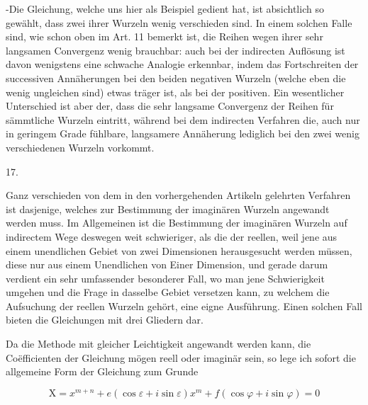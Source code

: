 \documentclass[10pt]{article}
\begin{document}
-Die Gleichung, welche uns hier als Beispiel gedient hat, ist absichtlich so gewählt, dass zwei ihrer Wurzeln wenig verschieden sind. In einem solchen Falle sind, wie schon oben im Art. 11 bemerkt ist, die Reihen wegen ihrer sehr langsamen Convergenz wenig brauchbar: auch bei der indirecten Auflösung ist davon wenigstens eine schwache Analogie erkennbar, indem das Fortschreiten der successiven Annäherungen bei den beiden negativen Wurzeln (welche eben die wenig ungleichen sind) etwas träger ist, als bei der positiven. Ein wesentlicher Unterschied ist aber der, dass die sehr langsame Convergenz der Reihen für sämmtliche Wurzeln eintritt, während bei dem indirecten Verfahren die, auch nur in geringem Grade fühlbare, langsamere Annäherung lediglich bei den zwei wenig verschiedenen Wurzeln vorkommt.

17.

Ganz verschieden von dem in den vorhergehenden Artikeln gelehrten Verfahren ist dasjenige, welches zur Bestimmung der imaginären Wurzeln angewandt werden muss. Im Allgemeinen ist die Bestimmung der imaginären Wurzeln auf indirectem Wege deswegen weit schwieriger, als die der reellen, weil jene aus einem unendlichen Gebiet von zwei Dimensionen herausgesucht werden müssen, diese nur aus einem Unendlichen von Einer Dimension, und gerade darum verdient ein sehr umfassender besonderer Fall, wo man jene Schwierigkeit umgehen und die Frage in dasselbe Gebiet versetzen kann, zu welchem die Aufsuchung der reellen Wurzeln gehört, eine eigne Ausführung. Einen solchen Fall bieten die Gleichungen mit drei Gliedern dar.

Da die Methode mit gleicher Leichtigkeit angewandt werden kann, die Coëfficienten der Gleichung mögen reell oder imaginär sein, so lege ich sofort die allgemeine Form der Gleichung zum Grunde

\[
\mathrm{X}=x^{m+n}+e(\cos \varepsilon+i \sin \varepsilon) x^{m}+f(\cos \varphi+i \sin \varphi)=0
\]
\end{document}
